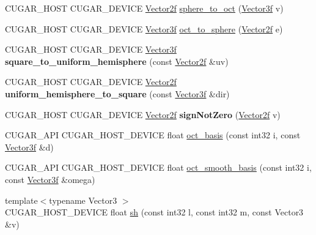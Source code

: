 \begin{DoxyCompactItemize}
\item 
C\+U\+G\+A\+R\+\_\+\+H\+O\+ST C\+U\+G\+A\+R\+\_\+\+D\+E\+V\+I\+CE \hyperlink{structcugar_1_1_vector}{Vector2f} \hyperlink{group__spherical__mappings_gad4cb74d8c6a86fdaf44bce3961fde975}{sphere\+\_\+to\+\_\+oct} (\hyperlink{structcugar_1_1_vector}{Vector3f} v)
\item 
C\+U\+G\+A\+R\+\_\+\+H\+O\+ST C\+U\+G\+A\+R\+\_\+\+D\+E\+V\+I\+CE \hyperlink{structcugar_1_1_vector}{Vector3f} \hyperlink{group__spherical__mappings_gad2300cdc769dfa8bb11e2b8452895545}{oct\+\_\+to\+\_\+sphere} (\hyperlink{structcugar_1_1_vector}{Vector2f} e)
\item 
\mbox{\label{namespacecugar_a6753abc699108b76c80a93321e355d7d}} 
C\+U\+G\+A\+R\+\_\+\+H\+O\+ST C\+U\+G\+A\+R\+\_\+\+D\+E\+V\+I\+CE \hyperlink{structcugar_1_1_vector}{Vector3f} {\bfseries square\+\_\+to\+\_\+uniform\+\_\+hemisphere} (const \hyperlink{structcugar_1_1_vector}{Vector2f} \&uv)
\item 
\mbox{\label{namespacecugar_a8125ab150a01973ab6cfc24d00534a81}} 
C\+U\+G\+A\+R\+\_\+\+H\+O\+ST C\+U\+G\+A\+R\+\_\+\+D\+E\+V\+I\+CE \hyperlink{structcugar_1_1_vector}{Vector2f} {\bfseries uniform\+\_\+hemisphere\+\_\+to\+\_\+square} (const \hyperlink{structcugar_1_1_vector}{Vector3f} \&dir)
\item 
\mbox{\label{namespacecugar_a739ff9948bd24824d7c88e480b51f7c3}} 
C\+U\+G\+A\+R\+\_\+\+H\+O\+ST C\+U\+G\+A\+R\+\_\+\+D\+E\+V\+I\+CE \hyperlink{structcugar_1_1_vector}{Vector2f} {\bfseries sign\+Not\+Zero} (\hyperlink{structcugar_1_1_vector}{Vector2f} v)
\item 
C\+U\+G\+A\+R\+\_\+\+A\+PI C\+U\+G\+A\+R\+\_\+\+H\+O\+S\+T\+\_\+\+D\+E\+V\+I\+CE float \hyperlink{group__octahedral__functions_gab5a718bf9c2f681d6ee998cdc429f5ef}{oct\+\_\+basis} (const int32 i, const \hyperlink{structcugar_1_1_vector}{Vector3f} \&d)
\item 
C\+U\+G\+A\+R\+\_\+\+A\+PI C\+U\+G\+A\+R\+\_\+\+H\+O\+S\+T\+\_\+\+D\+E\+V\+I\+CE float \hyperlink{group__octahedral__functions_ga71566a5a9606f7c37b4b04c9b6c8bac5}{oct\+\_\+smooth\+\_\+basis} (const int32 i, const \hyperlink{structcugar_1_1_vector}{Vector3f} \&omega)
\item 
{\footnotesize template$<$typename Vector3 $>$ }\\C\+U\+G\+A\+R\+\_\+\+H\+O\+S\+T\+\_\+\+D\+E\+V\+I\+CE float \hyperlink{group__spherical__harmonics_ga4a19db33e0259a49e5d872f18d7996c2}{sh} (const int32 l, const int32 m, const Vector3 \&v)

\end{DoxyCompactItemize}
